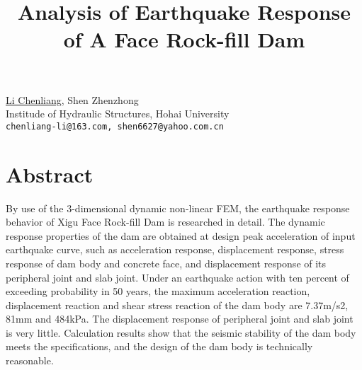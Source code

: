 \title{Analysis of Earthquake Response of A Face Rock-fill Dam}
\author{} \institute{}
\maketitle

\begin{center}
{\large \underline{Li Chenliang}, Shen Zhenzhong}\\
Institude of Hydraulic Structures, Hohai University\\
{\tt chenliang-li@163.com, shen6627@yahoo.com.cn}
\end{center}

\section*{Abstract}
By use of the 3-dimensional dynamic non-linear FEM, the earthquake response behavior of Xigu Face Rock-fill Dam is researched in detail. The dynamic response properties of the dam are obtained at design peak acceleration of input earthquake curve, such as acceleration response, displacement response, stress response of dam body and concrete face, and displacement response of its peripheral joint and slab joint. Under an earthquake action with ten percent of exceeding probability in 50 years, the maximum acceleration reaction, displacement reaction and shear stress reaction of the dam body are 7.37m/s2, 81mm and 484kPa. The displacement response of peripheral joint and slab joint is very little. Calculation results show that the seismic stability of the dam body meets the specifications, and the design of the dam body is technically reasonable.


